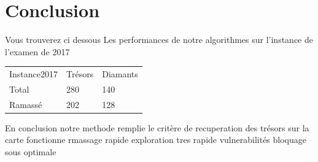 \documentclass[10pt]{article}
\newcommand\tab[1][0.65cm]{\hspace*{#1}}
\begin{document}
\section{Conclusion}
\tab Vous trouverez ci dessous Les performances de notre algorithmes sur l'instance de l'examen de 2017\\
\begin{center}
\begin{tabular}{lll}
   Instance2017 & Trésors & Diamants \\
   Total & 280 & 140\\
   Ramassé & 202 & 128 \\
\end{tabular}
\end{center}
\tab
En conclusion notre methode remplie le critère de recuperation des trésors sur la carte 
fonctionne 
rmassage rapide 
exploration tres rapide 
vulnerabilités 
bloquage
sous optimale 



	
\end{document}
